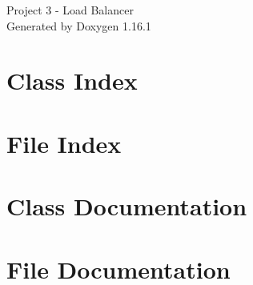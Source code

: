 \documentclass[twoside]{book}
\newcommand{\+}{\discretionary{\mbox{\scriptsize$\hookleftarrow$}}{}{}}
\newcommand{\clearemptydoublepage}{%
    \newpage{\pagestyle{empty}\cleardoublepage}%
  }
\begin{document}
  \raggedbottom
    \hypersetup{pageanchor=false,
                bookmarksnumbered=true,
                pdfencoding=unicode
               }
  \begin{titlepage}
  \vspace*{7cm}
  \begin{center}%
  {\Large Project 3 -\/ Load Balancer}\\
  \vspace*{1cm}
  {\large Generated by Doxygen 1.16.1}\\
  \end{center}
  \end{titlepage}
  \clearemptydoublepage
  \tableofcontents
  \clearemptydoublepage
  \hypersetup{pageanchor=true}
\chapter{Class Index}

\chapter{File Index}

\chapter{Class Documentation}





\chapter{File Documentation}
















  \backmatter
  \newpage
  \clearemptydoublepage
  \printindex
\end{document}
